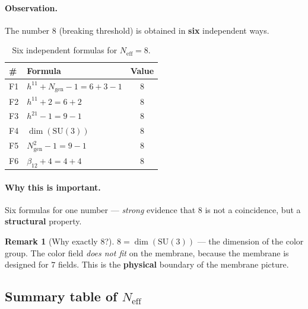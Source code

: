 \documentclass[11pt,a4paper]{article}
\newcommand{\SU}{\mathrm{SU}}
\newcommand{\Ngen}{N_{\text{gen}}}
\newcommand{\Neff}{N_{\text{eff}}}
\theoremstyle{definition}
\newtheorem{remark}[theorem]{Remark}
\begin{document}
\paragraph{Observation.}
The number $8$ (breaking threshold) is obtained in \textbf{six} independent 
ways.

\begin{table}[htbp]
\centering
\caption{Six independent formulas for $\Neff = 8$.}
\label{tab:six-neff-8}
\begin{tabular}{llc}
\toprule
\# & Formula & Value \\
\midrule
F1 & $h^{11} + \Ngen - 1 = 6 + 3 - 1$ & $8$ \\
F2 & $h^{11} + 2 = 6 + 2$ & $8$ \\
F3 & $h^{21} - 1 = 9 - 1$ & $8$ \\
F4 & $\dim(\SU(3))$ & $8$ \\
F5 & $\Ngen^2 - 1 = 9 - 1$ & $8$ \\
F6 & $\beta_{12} + 4 = 4 + 4$ & $8$ \\
\bottomrule
\end{tabular}
\end{table}

\paragraph{Why this is important.}
Six formulas for one number — \emph{strong} evidence 
that $8$ is not a coincidence, but a \textbf{structural} property.

\begin{remark}[Why exactly $8$?]
\label{rem:why-8}
$8 = \dim(\SU(3))$ — the dimension of the color group. 
The color field \emph{does not fit} on the membrane, because 
the membrane is designed for $7$ fields. This is the \textbf{physical} 
boundary of the membrane picture.
\end{remark}

\subsection{Summary table of $N_{\text{eff}}$}
\label{subsec:neff-summary-table}
\end{document}
